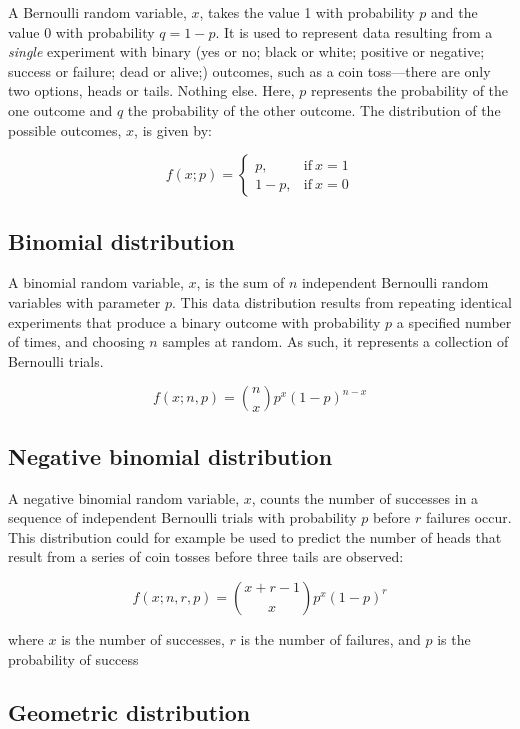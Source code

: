 \documentclass[english,10pt,a4paper,oneside]{book}
\theoremstyle{definition}
\theoremstyle{definition}
\theoremstyle{definition}
\theoremstyle{remark}
\begin{document}
A Bernoulli random variable, \(x\), takes the value 1 with probability
\(p\) and the value 0 with probability \(q=1−p\). It is used to
represent data resulting from a \emph{single} experiment with binary
(yes or no; black or white; positive or negative; success or failure;
dead or alive;) outcomes, such as a coin toss---there are only two
options, heads or tails. Nothing else. Here, \(p\) represents the
probability of the one outcome and \(q\) the probability of the other
outcome. The distribution of the possible outcomes, \(x\), is given by:

\[
f(x;p)=
  \begin{cases}
    p, &\text{if}~x=1\\
    1-p, &\text{if}~x=0
  \end{cases}
\]

\subsection{Binomial distribution}\label{binomial-distribution}

A binomial random variable, \(x\), is the sum of \(n\) independent
Bernoulli random variables with parameter \(p\). This data distribution
results from repeating identical experiments that produce a binary
outcome with probability \(p\) a specified number of times, and choosing
\(n\) samples at random. As such, it represents a collection of
Bernoulli trials.

\[f(x;n,p)= {n\choose x}p^{x}(1-p)^{n-x}\]

\subsection{Negative binomial
distribution}\label{negative-binomial-distribution}

A negative binomial random variable, \(x\), counts the number of
successes in a sequence of independent Bernoulli trials with probability
\(p\) before \(r\) failures occur. This distribution could for example
be used to predict the number of heads that result from a series of coin
tosses before three tails are observed:

\[f(x;n,r,p)= {x+r-1\choose x}p^{x}(1-p)^{r}\]

where \(x\) is the number of successes, \(r\) is the number of failures,
and \(p\) is the probability of success

\subsection{Geometric distribution}\label{geometric-distribution}
\end{document}
